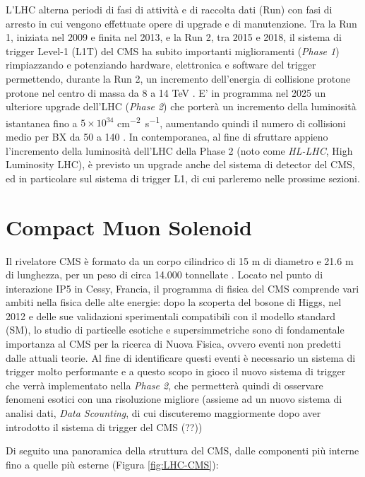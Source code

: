 L'LHC alterna periodi di fasi di attività e di raccolta dati (Run) con fasi di arresto in cui vengono effettuate opere di upgrade e di manutenzione. Tra la Run 1, iniziata nel 2009 e finita nel 2013, e la Run 2, tra 2015 e 2018, il sistema di trigger Level-1 (L1T) del CMS ha subito importanti miglioramenti (\textit{Phase 1}) rimpiazzando e potenziando hardware, elettronica e software del trigger permettendo, durante la Run 2, un incremento dell'energia di collisione protone protone nel centro di massa da 8 a 14 TeV \cite{sirunyan2020performance}. E' in programma nel 2025 un ulteriore upgrade dell'LHC (\textit{Phase 2}) che porterà un incremento della luminosità istantanea fino a $5\times 10^{34}$ \si{cm^{-2} s^{-1}}, aumentando quindi il numero di collisioni medio per BX da 50 a 140 \cite{collaboration2021phase}. In contemporanea, al fine di sfruttare appieno l'incremento della luminosità dell'LHC della Phase 2 (noto come \textit{HL-LHC}, High Luminosity LHC), è previsto un upgrade anche del sistema di detector del CMS, ed in particolare sul sistema di trigger L1, di cui parleremo nelle prossime sezioni.

\section{Compact Muon Solenoid}

Il rivelatore CMS è formato da un corpo cilindrico di 15 m di diametro e 21.6 m di lunghezza, per un peso di circa 14.000 tonnellate \cite{MasterThesisNicLai}. Locato nel punto di interazione IP5 in Cessy, Francia, il programma di fisica del CMS comprende vari ambiti nella fisica delle alte energie: dopo la scoperta del bosone di Higgs, nel 2012 e delle sue validazioni sperimentali compatibili con il modello standard (SM), lo studio di particelle esotiche e supersimmetriche sono di fondamentale importanza al CMS per la ricerca di Nuova Fisica, ovvero eventi non predetti dalle attuali teorie. Al fine di identificare questi eventi è necessario un sistema di trigger molto performante \cite{sirunyan2020performance} e a questo scopo in gioco il nuovo sistema di trigger che verrà implementato nella \textit{Phase 2}, che permetterà quindi di osservare fenomeni esotici con una risoluzione migliore (assieme ad un nuovo sistema di analisi dati, \textit{Data Scounting}, di cui discuteremo maggiormente dopo aver introdotto il sistema di trigger del CMS (??))

Di seguito una panoramica della struttura del CMS, dalle componenti più interne fino a quelle più esterne \cite{MasterThesisNicLai}(Figura \ref{fig:LHC-CMS}):

